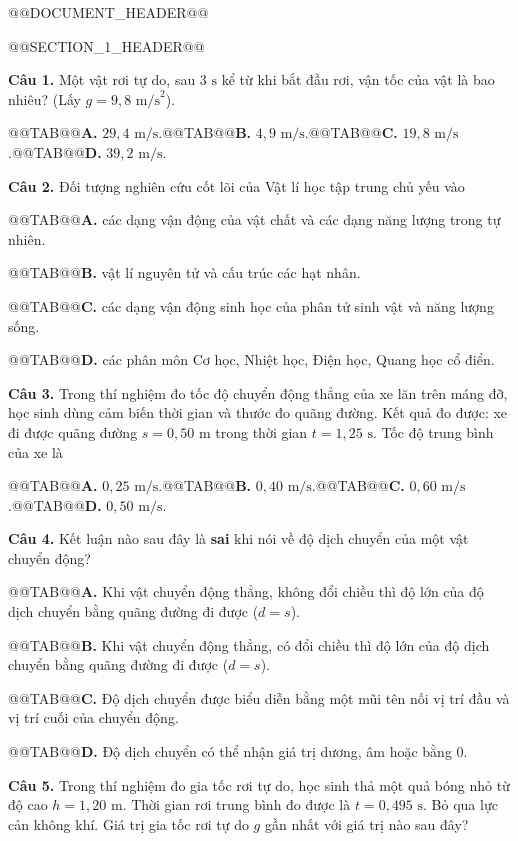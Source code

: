 \documentclass{article}
\begin{document}
@@DOCUMENT_HEADER@@

@@SECTION_1_HEADER@@

\textbf{Câu 1.} Một vật rơi tự do, sau $3\text{ s}$ kể từ khi bắt đầu rơi, vận tốc của vật là bao nhiêu? (Lấy $g = 9{,}8\text{ m/s}^2$).

@@TAB@@\textbf{A.} $29{,}4\text{ m/s}$.@@TAB@@\textbf{B.} $4{,}9\text{ m/s}$.@@TAB@@\textbf{C.} $19{,}8\text{ m/s}$.@@TAB@@\textbf{D.} $39{,}2\text{ m/s}$.

\textbf{Câu 2.} Đối tượng nghiên cứu cốt lõi của Vật lí học tập trung chủ yếu vào

@@TAB@@\textbf{A.} các dạng vận động của vật chất và các dạng năng lượng trong tự nhiên.

@@TAB@@\textbf{B.} vật lí nguyên tử và cấu trúc các hạt nhân.

@@TAB@@\textbf{C.} các dạng vận động sinh học của phân tử sinh vật và năng lượng sống.

@@TAB@@\textbf{D.} các phân môn Cơ học, Nhiệt học, Điện học, Quang học cổ điển.

\textbf{Câu 3.} Trong thí nghiệm đo tốc độ chuyển động thẳng của xe lăn trên máng đỡ, học sinh dùng cảm biến thời gian và thước đo quãng đường. Kết quả đo được: xe đi được quãng đường $s = 0{,}50\text{ m}$ trong thời gian $t = 1{,}25\text{ s}$. Tốc độ trung bình của xe là

@@TAB@@\textbf{A.} $0{,}25\text{ m/s}$.@@TAB@@\textbf{B.} $0{,}40\text{ m/s}$.@@TAB@@\textbf{C.} $0{,}60\text{ m/s}$.@@TAB@@\textbf{D.} $0{,}50\text{ m/s}$.

\textbf{Câu 4.} Kết luận nào sau đây là \textbf{sai} khi nói về độ dịch chuyển của một vật chuyển động?

@@TAB@@\textbf{A.} Khi vật chuyển động thẳng, không đổi chiều thì độ lớn của độ dịch chuyển bằng quãng đường đi được ($d = s$).

@@TAB@@\textbf{B.} Khi vật chuyển động thẳng, có đổi chiều thì độ lớn của độ dịch chuyển bằng quãng đường đi được ($d = s$).

@@TAB@@\textbf{C.} Độ dịch chuyển được biểu diễn bằng một mũi tên nối vị trí đầu và vị trí cuối của chuyển động.

@@TAB@@\textbf{D.} Độ dịch chuyển có thể nhận giá trị dương, âm hoặc bằng $0$.

\textbf{Câu 5.} Trong thí nghiệm đo gia tốc rơi tự do, học sinh thả một quả bóng nhỏ từ độ cao $h = 1{,}20\text{ m}$. Thời gian rơi trung bình đo được là $t = 0{,}495\text{ s}$. Bỏ qua lực cản không khí. Giá trị gia tốc rơi tự do $g$ gần nhất với giá trị nào sau đây?
\end{document}
